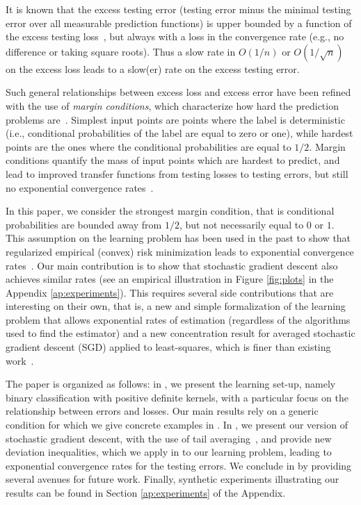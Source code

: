 \documentclass[final]{colt2018} %
\begin{document}
 It is known that the excess testing error (testing error minus the minimal testing error over all measurable prediction functions) is upper bounded by a function of the excess testing loss~\citep{zhang2004statistical,bartlett2006convexity}, but always with a loss in the convergence rate (e.g., no difference or taking square roots). Thus a slow rate in $O(1/n)$ or $O(1/\sqrt{n})$ on the excess loss leads to a slow(er) rate on the excess testing error.

 Such general relationships between excess loss and excess error have been refined with the use of \emph{margin conditions}, which characterize  how hard the prediction problems are~\citep[see, e.g.,][]{mammen1999smooth}. Simplest input points are points where the label is deterministic (i.e., conditional probabilities of the label are equal to zero or one), while hardest points are the ones where the conditional probabilities are equal to $1/2$. Margin conditions quantify the mass of input points which are hardest to predict, and lead to improved transfer functions from testing losses to testing errors, but still no exponential convergence rates~\citep{bartlett2006convexity}.
 
In this paper, we consider the strongest margin condition, that is conditional probabilities are bounded away from $1/2$, but not necessarily equal to $0$ or $1$. This assumption on the learning problem has been used in the past to show that regularized empirical (convex) risk minimization leads to exponential convergence rates~\citep{audibert2007fast,koltchinskii2005exponential}. Our main contribution is to show that stochastic gradient descent also achieves similar rates (see an empirical illustration in Figure \ref{fig:plots} in the Appendix \ref{ap:experiments}). This requires several side contributions that are interesting on their own, that is, a new and simple formalization of the learning problem that allows exponential rates of estimation (regardless of the algorithms used to find the estimator) and a new  concentration result for averaged stochastic gradient descent (SGD) applied to least-squares, which is finer than existing work~\citep{newsto}.
 
The paper is organized as follows: in , we present the learning set-up, namely binary classification with positive definite kernels, with a particular focus on the relationship between errors and losses. Our main results rely on a generic condition for which we give concrete examples in . In , we present our version of stochastic gradient descent, with the use of tail averaging~\citep{jain2016parallelizing}, and provide new  deviation inequalities, which we apply in  to our learning problem, leading to exponential convergence rates for the testing errors. We conclude in  by providing several avenues for future work. Finally, synthetic experiments illustrating our results can be found in Section \ref{ap:experiments} of the Appendix.
\end{document}
